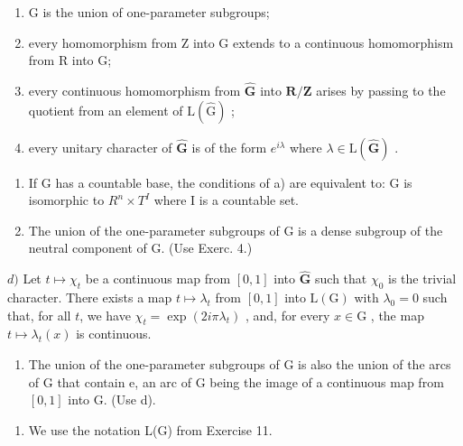 \begin{enumerate}
\def\labelenumi{(\roman{enumi})}
\item
  G is the union of one-parameter subgroups;
\item
  every homomorphism from Z into G extends to a continuous homomorphism from R into G;
\item
  every continuous homomorphism from \(\widehat{\mathbf{G}}\) into \(\mathbf{R} / \mathbf{Z}\) arises by passing to the quotient from an element of \(\mathrm{L}(\widehat{\mathrm{G}})\) ;
\item
  every unitary character of \(\widehat{\mathbf{G}}\) is of the form \(e^{i\lambda}\) where \(\lambda \in \mathrm{L}(\widehat{\mathbf{G}})\) .
\end{enumerate}

\begin{enumerate}
\def\labelenumi{\alph{enumi})}
\setcounter{enumi}{1}
\item
  If G has a countable base, the conditions of a) are equivalent to: G is isomorphic to \(R^{n} \times T^{I}\) where I is a countable set.
\item
  The union of the one-parameter subgroups of G is a dense subgroup of the neutral component of G. (Use Exerc. 4.)
\end{enumerate}

\(d)\) Let \(t \mapsto \chi_t\) be a continuous map from \([0,1]\) into \(\widehat{\mathbf{G}}\) such that \(\chi_0\) is the trivial character. There exists a map \(t \mapsto \lambda_t\) from \([0,1]\) into \(\mathrm{L}(\mathrm{G})\) with \(\lambda_0 = 0\) such that, for all \(t\), we have \(\chi_t = \exp(2i\pi\lambda_t)\) , and, for every \(x \in \mathrm{G}\) , the map \(t \mapsto \lambda_t(x)\) is continuous.

\begin{enumerate}
\def\labelenumi{\alph{enumi})}
\setcounter{enumi}{4}
\tightlist
\item
  The union of the one-parameter subgroups of G is also the union of the arcs of G that contain e, an arc of G being the image of a continuous map from \([0,1]\) into G. (Use d).
\end{enumerate}

\begin{enumerate}
\def\labelenumi{\arabic{enumi})}
\setcounter{enumi}{11}
\tightlist
\item
  We use the notation L(G) from Exercise 11.
\end{enumerate}

